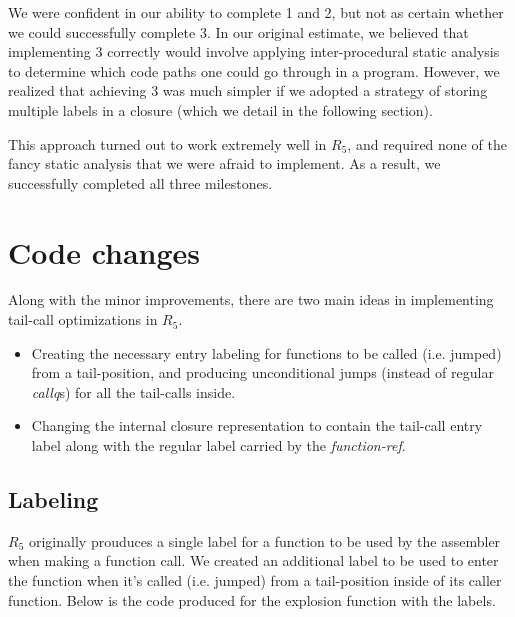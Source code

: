 \documentclass[12pt]{article}
\begin{document}
We were confident in our ability to complete 1 and 2, but not as certain whether
we could successfully complete 3. In our original estimate, we believed that
implementing 3 correctly would involve applying inter-procedural static analysis
to determine which code paths one could go through in a program. However, we
realized that achieving 3 was much simpler if we adopted a strategy of storing
multiple labels in a closure (which we detail in the following section).

This approach turned out to work extremely well in $R_5$, and required none of the
fancy static analysis that we were afraid to implement. As a result, we successfully
completed all three milestones.

\section{Code changes}
Along with the minor improvements, there are two main ideas in
implementing tail-call optimizations in $R_5$.

\begin{itemize}
\item Creating the necessary entry labeling for functions to be called
  (i.e. jumped) from a tail-position, and producing unconditional
  jumps (instead of regular \emph{callq}s) for all the tail-calls inside.
\item Changing the internal closure representation to contain the
  tail-call entry label along with the regular label carried by the
  \emph{function-ref}.
\end{itemize}

\subsection{Labeling}

$R_5$ originally prouduces a single label for a function to be used by
the assembler when making a function call. We created an additional
label to be used to enter the function when it's called (i.e. jumped)
from a tail-position inside of its caller function. Below is the code
produced for the explosion function with the labels.
\end{document}
